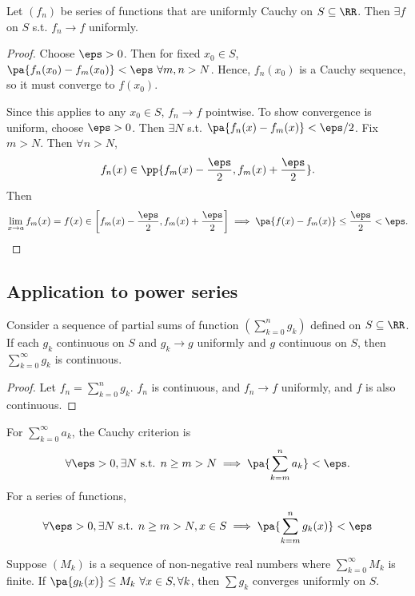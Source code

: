 \documentclass[11pt]{scrartcl}
\numberwithin{equation}{section}
\begin{document}
\begin{theorem}
    Let $(f_n)$ be series of functions that are uniformly Cauchy on 
    $S \subseteq\RR$. Then $\exists f$ on $S$ s.t. $f_n\to f$ uniformly.
\end{theorem}
\begin{proof}
    Choose $\eps>0$. Then for fixed $x_0\in S$, 
    $\pa{f_n(x_0)-f_m(x_0)} <\eps\ \forall m,n>N$.
    Hence, $f_n(x_0)$ is a Cauchy sequence, so it must converge to $f(x_0)$.

    Since this applies to any $x_0\in S$, $f_n\to f$ pointwise.
    To show convergence is uniform, choose $\eps>0$. Then $\exists N$
    s.t. $\pa{f_n(x)-f_m(x)}<\eps/2$. Fix $m>N$. 
    Then $\forall n>N$, 
    \[
        f_n(x)\in\pp{f_m(x)-\frac{\eps}{2}, f_m(x)+\frac{\eps}{2}}.
    \]
    Then 
    \[
        \lim_{x\rightarrow a}f_m(x) = f(x) \in \left[f_m(x)-\frac{\eps}{2}, f_m(x)+\frac{\eps}{2}\right]\implies \pa{f(x)-f_m(x)}\leq \frac{\eps}{2}<\eps.\qedhere
    \]
\end{proof}
\subsection{Application to power series}
\begin{proposition}
    Consider a sequence of partial sums of function $(\sum_{k=0}^{n}g_k)$
    defined on $S \subseteq\RR$. If each $g_k$ continuous on $S$
    and $g_k\to g$ uniformly and $g$ continuous on $S$,
    then $\sum_{k=0}^{\infty}g_k$ is continuous.
\end{proposition}

\begin{proof}
    Let $f_n=\sum_{k=0}^{n}g_k$. 
    $f_n$ is continuous, and $f_n\to f$ uniformly, and $f$ is also continuous.
\end{proof}

\begin{proposition}
    \label{prop:cauchycriterionfunction}
    For $\sum_{k=0}^{\infty}a_k$, the Cauchy criterion is 
    \[
        \forall \eps>0, \exists N\text{ s.t. } n\geq m>N \implies 
        \pa{\sum_{k=m}^{n}a_k}<\eps.
    \]
    For a series of functions,
    \[
        \forall \eps>0, \exists N\text{ s.t. } n\geq m>N, x\in S \implies
        \pa{\sum_{k=m}^{n}g_k(x)}<\eps
    \]
\end{proposition}

\begin{theorem}
    \label{thm:weirstrasmtest}
    Suppose $(M_k)$ is a sequence of non-negative real numbers
    where $\sum_{k=0}^{\infty}M_k$ is finite. If 
    $\pa{g_k(x)}\leq M_k\ \forall x\in S, \forall k$, then 
    $\sum g_k$ converges uniformly on $S$.
\end{theorem}
\end{document}
